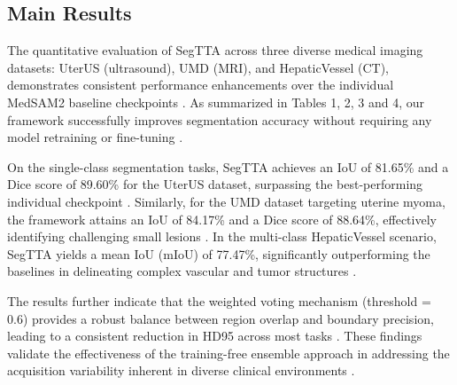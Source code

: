 \documentclass{article}
\begin{document}
\subsection{Main Results}

The quantitative evaluation of SegTTA across three diverse medical imaging datasets: UterUS (ultrasound), UMD (MRI), and HepaticVessel (CT), demonstrates consistent performance enhancements over the individual MedSAM2 baseline checkpoints \cite{bones2024uterus, umd2024, task08hepatic2019}. As summarized in Tables 1, 2, 3 and 4, our framework successfully improves segmentation accuracy without requiring any model retraining or fine-tuning \cite{ma2025medsam2}.

On the single-class segmentation tasks, SegTTA achieves an IoU of 81.65\% and a Dice score of 89.60\% for the UterUS dataset, surpassing the best-performing individual checkpoint \cite{bones2024uterus}. Similarly, for the UMD dataset targeting uterine myoma, the framework attains an IoU of 84.17\% and a Dice score of 88.64\%, effectively identifying challenging small lesions \cite{umd2024}. In the multi-class HepaticVessel scenario, SegTTA yields a mean IoU (mIoU) of 77.47\%, significantly outperforming the baselines in delineating complex vascular and tumor structures \cite{task08hepatic2019}.

The results further indicate that the weighted voting mechanism (threshold = 0.6) provides a robust balance between region overlap and boundary precision, leading to a consistent reduction in HD95 across most tasks \cite{tasci2021voting, toth2008classification}. These findings validate the effectiveness of the training-free ensemble approach in addressing the acquisition variability inherent in diverse clinical environments \cite{ma2025medsam2}.
\end{document}
